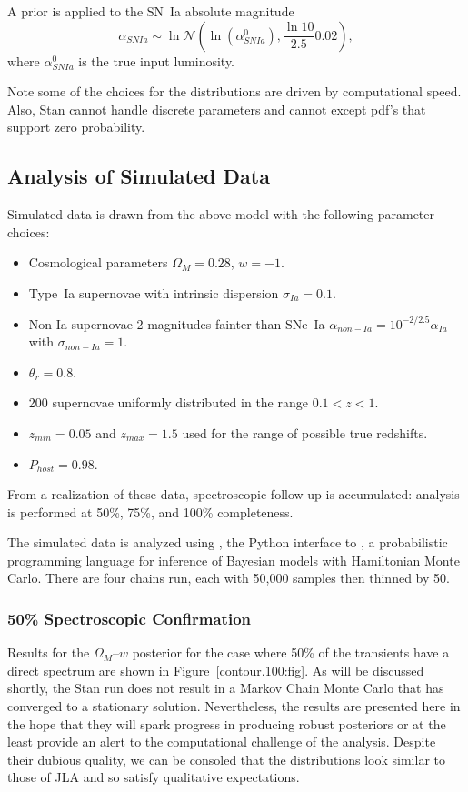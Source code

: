 \documentclass[preprint]{aastex}
\begin{document}
A prior is applied to the SN~Ia absolute magnitude
\begin{equation}
\alpha_{SNIa} \sim \ln\mathcal{N}\left(\ln\left(\alpha^0_{SNIa}\right),\frac{\ln{10}}{2.5}0.02\right),
\end{equation}
where $\alpha^0_{SNIa}$ is the true input luminosity.

Note some of the choices for the distributions are driven by computational
speed. 
Also, Stan cannot handle discrete parameters and
cannot except pdf's that support zero probability.

\subsection{Analysis of Simulated Data}
Simulated data is drawn from the above model with the following parameter
choices:
\begin{itemize}
\item Cosmological parameters $\Omega_M=0.28$, $w=-1$.
\item Type~Ia supernovae with intrinsic dispersion $\sigma_{Ia}=0.1$.
\item Non-Ia supernovae 2 magnitudes fainter than SNe~Ia $\alpha_{\mathit{non-Ia}} = 10^{-2/2.5} \alpha_{Ia}$ with 
 $\sigma_{\mathit{non-Ia}}=1$.
\item $\theta_r=0.8$.
\item 200 supernovae uniformly distributed in the range $0.1<z<1$.
\item $z_{min}=0.05$ and $z_{max}=1.5$ used for the range of possible true redshifts.
\item $P_{host}=0.98$.
\end{itemize}
From a realization of these data, spectroscopic follow-up is
accumulated: analysis is performed at 50\%, 75\%, and 100\% 
completeness.

The simulated data is analyzed using \citet{pystan-software:2015},
the Python interface to
\citet{stan-software:2015}, a probabilistic programming language for
inference of Bayesian models with Hamiltonian Monte Carlo.  There are
four chains run, each with 50,000 samples then thinned by 50.

\subsubsection{50\% Spectroscopic Confirmation}
Results for the $\Omega_M$--$w$ posterior for the
case where 50\% of the transients have a direct spectrum
are shown in Figure~\ref{contour.100:fig}.
As will be discussed shortly, the Stan run does not result in a Markov Chain Monte Carlo
that has
converged to a stationary solution.  Nevertheless, the results are presented here
in the hope that they will spark progress in producing robust posteriors or at the
least provide an alert to the computational challenge of the analysis.
Despite their dubious quality, we can be consoled that the distributions
look similar to those of JLA \citep{2014A&A...568A..22B} 
and so satisfy qualitative expectations.
\end{document}
